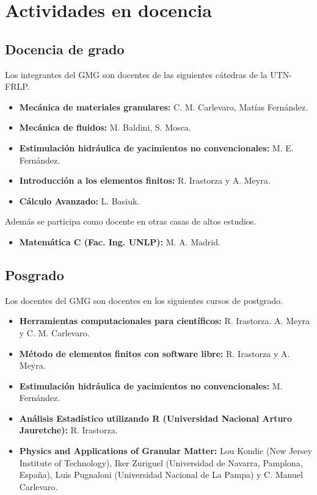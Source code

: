 \documentclass[a4paper,11pt,twoside,final,titlepage,onecolumn,openright]{report}
\begin{document}
\chapter{Actividades en docencia}

\section{Docencia de grado}

Los integrantes del GMG son docentes de las siguientes cátedras de la UTN-FRLP.

\begin{itemize}
 \item {\bf Mecánica de materiales granulares:} C. M. Carlevaro, Matías Fernández.
 \item {\bf Mecánica de fluidos:} M. Baldini, S. Mosca.
 \item {\bf Estimulación hidráulica de yacimientos no convencionales:} M. E. Fernández.
 \item {\bf Introducción a los elementos finitos:} R. Irastorza y A. Meyra.
 \item {\bf Cálculo Avanzado:} L. Basiuk.
\end{itemize}

Además se participa como docente en otras casas de altos estudios.

\begin{itemize}
 \item {\bf Matemática C (Fac. Ing. UNLP):} M. A. Madrid.
\end{itemize}


\section{Posgrado}

Los docentes del GMG son docentes en los siguientes cursos de postgrado.

\begin{itemize}
 \item {\bf Herramientas computacionales para científicos:} R. Irastorza. A. Meyra y C. M. Carlevaro.
 \item \textbf{Método de elementos finitos con software libre:} R. Irastorza y A. Meyra.
 \item \textbf{Estimulación hidráulica de yacimientos no convencionales:} M. Fernández.
 \item {\bf Análisis Estadístico utilizando R (Universidad Nacional Arturo Jauretche):} R. Irastorza.
 \item \textbf{Physics and Applications of Granular Matter:} Lou Kondic (New Jersey Institute of Technology), Iker Zuriguel (Universidad de Navarra, Pamplona, España), Luis Pugnaloni (Universidad Nacional de La Pampa) y C. Manuel Carlevaro.

\end{itemize}
\end{document}
